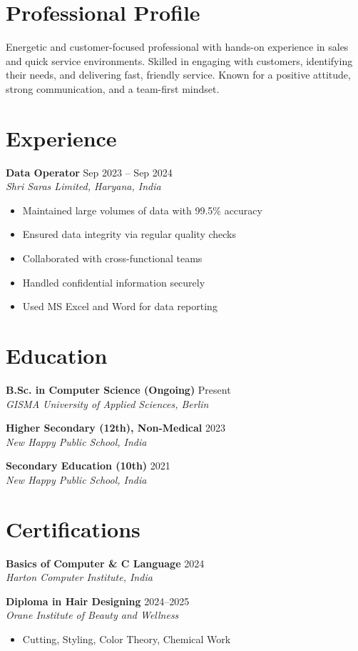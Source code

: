 \documentclass[11pt,a4paper]{article}
\newcommand{\cventry}[4]{
    \textbf{#1} \hfill \textcolor{accent}{#2} \\
    \textit{#3} \\
    #4
    \vspace{4pt}
}
\newcommand{\educationentry}[3]{
    \textbf{#1} \hfill \textcolor{accent}{#2} \\
    \textit{#3}
    \vspace{3pt}
}
\begin{document}
\begin{minipage}[t]{0.63\textwidth}
    \section*{Professional Profile}
    Energetic and customer-focused professional with hands-on experience in sales and quick service environments. Skilled in engaging with customers, identifying their needs, and delivering fast, friendly service. Known for a positive attitude, strong communication, and a team-first mindset.

    \section*{Experience}
    \cventry{Data Operator}{Sep 2023 – Sep 2024}{Shri Saras Limited, Haryana, India}{
        \begin{itemize}[noitemsep, leftmargin=12pt]
            \item Maintained large volumes of data with 99.5\% accuracy
            \item Ensured data integrity via regular quality checks
            \item Collaborated with cross-functional teams
            \item Handled confidential information securely
            \item Used MS Excel and Word for data reporting
        \end{itemize}
    }

    \section*{Education}
    \educationentry{B.Sc. in Computer Science (Ongoing)}{Present}{GISMA University of Applied Sciences, Berlin}
    
    \educationentry{Higher Secondary (12th), Non-Medical}{2023}{New Happy Public School, India}
    
    \educationentry{Secondary Education (10th)}{2021}{New Happy Public School, India}

    \section*{Certifications}
    \educationentry{Basics of Computer \& C Language}{2024}{Harton Computer Institute, India}
    
    \educationentry{Diploma in Hair Designing}{2024–2025}{Orane Institute of Beauty and Wellness}
    \begin{itemize}[noitemsep, leftmargin=12pt]
        \item Cutting, Styling, Color Theory, Chemical Work
    \end{itemize}

\end{minipage}%
\end{document}
